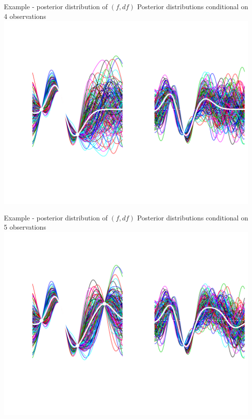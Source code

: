 \documentclass[ignorenonframetext,xcolor=pdflatex,table,dvipsnames,serif]{beamer}
\begin{document}
\begin{frame}{Example - posterior distribution of $(f, df)$}
  Posterior distributions conditional on 4 observations
  \center\includegraphics[scale=0.5]{postAni05}
\end{frame}

\begin{frame}{Example - posterior distribution of $(f, df)$}
  Posterior distributions conditional on 5 observations
  \center\includegraphics[scale=0.5]{postAni06}
\end{frame}
\end{document}
